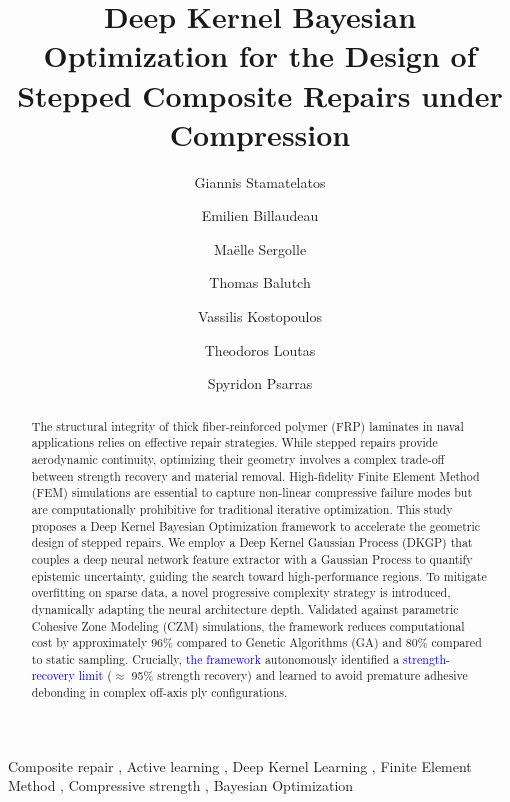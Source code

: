 \documentclass[
  preprint,
  12pt,
  a4paper
]{elsarticle}
\newcommand{\new}[1]{\textcolor{blue}{#1}}
\begin{document}
\begin{frontmatter}

\title{Deep Kernel Bayesian Optimization for the Design of Stepped Composite Repairs under Compression}


\author[1]{Giannis Stamatelatos}

\author[2]{Emilien Billaudeau}
\author[2]{Maëlle Sergolle}
\author[2]{Thomas Balutch}
\author[1]{Vassilis Kostopoulos}
\author[1]{Theodoros Loutas}
\author[1]{Spyridon Psarras}

\address[1]{Applied Mechanics Laboratory (AML), Department of Mechanical Engineering \& Aeronautics, University of Patras, Patras, Greece}
\address[2]{Naval Group, Centre d'Expertise des Structures et Matériaux Navals, Technocampus Océan, 5 rue de l'Halbran, 4434, France}


\begin{abstract}
The structural integrity of thick fiber-reinforced polymer (FRP) laminates in naval applications relies on effective repair strategies. While stepped repairs provide aerodynamic continuity, optimizing their geometry involves a complex trade-off between strength recovery and material removal. High-fidelity Finite Element Method (FEM) simulations are essential to capture non-linear compressive failure modes but are computationally prohibitive for traditional iterative optimization. This study proposes a Deep Kernel Bayesian Optimization framework to accelerate the geometric design of stepped repairs. We employ a Deep Kernel Gaussian Process (DKGP) that couples a deep neural network feature extractor with a Gaussian Process to quantify epistemic uncertainty, guiding the search toward high-performance regions. To mitigate overfitting on sparse data, a novel progressive complexity strategy is introduced, dynamically adapting the neural architecture depth. Validated against parametric Cohesive Zone Modeling (CZM) simulations, the framework reduces computational cost by approximately 96\% compared to Genetic Algorithms (GA) and 80\% compared to static sampling. Crucially, \new{the framework} autonomously identified a \new{strength-recovery limit} ($\approx$ 95\% strength recovery) and learned to avoid premature adhesive debonding in complex off-axis ply configurations.
\end{abstract}

\begin{keyword}
Composite repair \sep 
Active learning \sep 
Deep Kernel Learning \sep 
Finite Element Method \sep 
Compressive strength \sep 
Bayesian Optimization
\end{keyword}

\end{frontmatter}
\end{document}
